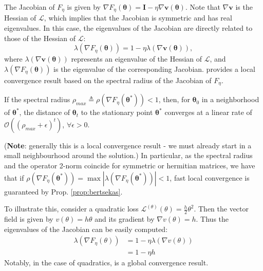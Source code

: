 \documentclass{article}
\renewcommand{\vec}[1]{\ensuremath{\boldsymbol{#1}}}
\newcommand{\mat}[1]{\ensuremath{\boldsymbol{#1}}}
\newcommand{\btheta}[0]{\ensuremath{\boldsymbol{\theta}}}
\begin{document}
The Jacobian of $F_\eta$ is given by $\nabla F_\eta(\btheta) = \mat{I} - \eta \nabla \vec{v}(\btheta)$. Note that $\nabla \vec{v}$ is the Hessian of $\mathcal{L}$, which implies that the Jacobian is symmetric and has real eigenvalues. In this case, the eigenvalues of the Jacobian are directly related to those of the Hessian of $\mathcal{L}$:
\begin{equation}
    \lambda (\nabla F_\eta (\btheta)) = 1 - \eta \lambda(\nabla \vec{v} (\btheta)),
\end{equation}
where $ \lambda(\nabla \vec{v} (\btheta))$ represents an eigenvalue of the Hessian of  $\mathcal{L}$, and $\lambda (\nabla F_\eta (\btheta))$ is the eigenvalue of the corresponding Jacobian.  provides a local convergence result based on the spectral radius of the Jacobian of $F_\eta$.

\begin{prop} \label{prop:bertsekas}
If the spectral radius $\rho_{max} \triangleq \rho (\nabla F_\eta (\vec{\theta}^*)) < 1$, then, for $\vec{\theta}_0$ in a neighborhood of $\vec{\theta}^*$, the distance of $\vec{\theta}_t$ to the stationary point $\vec{\theta }^*$ converges at a linear rate of $\mathcal{O}\left(\left(\rho_{max} + \epsilon \right)^t\right)$, $\forall \epsilon > 0$.
\end{prop}
(\textbf{Note}: generally this is a local convergence result - we must already start in a small neighbourhood around the solution.)
In particular, as the spectral radius and the operator 2-norm coincide for symmetric or hermitian matrices, we have that if $\rho (\nabla F_\eta (\btheta^*)) = \max |\lambda (\nabla F_\eta (\btheta^*))| < 1$, fast local convergence is guaranteed by Prop. \ref{prop:bertsekas}.
\par
To illustrate this, consider a quadratic loss $\mathcal{L}^{(\theta)}(\theta) = \frac{h}{2} \theta^2$. Then the vector field is given by $v(\theta) = h\theta$ and its gradient by $\nabla v(\theta) = h$. Thus the eigenvalues of the Jacobian can be easily computed:
\begin{align}
    \lambda(\nabla F_\eta (\theta)) &= 1-\eta \lambda(\nabla v(\theta)) \nonumber \\
    &= 1 -\eta h
\end{align}
Notably, in the case of quadratics,  is a global convergence result. 
\\
      
\end{document}
